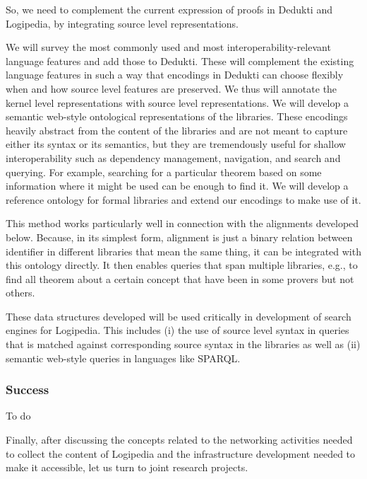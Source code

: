So, we need to complement the current expression of proofs in Dedukti
and Logipedia, by integrating source level representations.

We will survey the most commonly used and most
interoperability-relevant language features and add those to Dedukti.
These will complement the existing language features in such a way
that encodings in Dedukti can choose flexibly when and how source
level features are preserved.  We thus will annotate the kernel level
representations with source level representations.  We will develop a
semantic web-style ontological representations of the libraries.
These encodings heavily abstract from the content of the libraries and
are not meant to capture either its syntax or its semantics, but they
are tremendously useful for shallow interoperability such as
dependency management, navigation, and search and querying.  For
example, searching for a particular theorem based on some information
where it might be used can be enough to find it.  We will develop a
reference ontology for formal libraries and extend our encodings to
make use of it.

This method works particularly well in connection with the alignments
developed below. Because, in its simplest form, alignment is just a
binary relation between identifier in different libraries that mean
the same thing, it can be integrated with this ontology directly.  It
then enables queries that span multiple libraries, e.g., to find all
theorem about a certain concept that have been in some provers but not
others.

These data structures developed will be used
critically in development of search engines for Logipedia.  This
includes (i) the use of source level syntax in queries that is matched
against corresponding source syntax in the libraries as well as (ii)
semantic web-style queries in languages like SPARQL.

\subsubsection*{Success}

{\color{red} To do}


Finally, after discussing the concepts related to the networking activities
needed to collect the content of Logipedia and the infrastructure development
needed to make it accessible, let us turn to joint research projects. 

